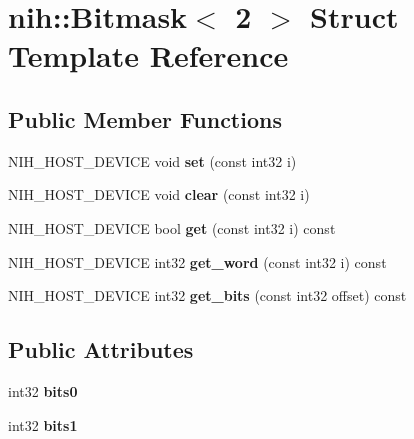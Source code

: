 \hypertarget{structnih_1_1_bitmask_3_012_01_4}{
\section{nih\-:\-:\-Bitmask$<$ 2 $>$ \-Struct \-Template \-Reference}
\label{structnih_1_1_bitmask_3_012_01_4}
}
\subsection*{\-Public \-Member \-Functions}
\begin{DoxyCompactItemize}
\item 
\hypertarget{structnih_1_1_bitmask_3_012_01_4_a5fefd68260586a2c0f29f5239f2c33d7}{
\-N\-I\-H\-\_\-\-H\-O\-S\-T\-\_\-\-D\-E\-V\-I\-C\-E void {\bfseries set} (const int32 i)}
\label{structnih_1_1_bitmask_3_012_01_4_a5fefd68260586a2c0f29f5239f2c33d7}

\item 
\hypertarget{structnih_1_1_bitmask_3_012_01_4_a787f893fbd1e4b4d9101004dc47ac9a6}{
\-N\-I\-H\-\_\-\-H\-O\-S\-T\-\_\-\-D\-E\-V\-I\-C\-E void {\bfseries clear} (const int32 i)}
\label{structnih_1_1_bitmask_3_012_01_4_a787f893fbd1e4b4d9101004dc47ac9a6}

\item 
\hypertarget{structnih_1_1_bitmask_3_012_01_4_ab9309a5f6621a86279218251852193d9}{
\-N\-I\-H\-\_\-\-H\-O\-S\-T\-\_\-\-D\-E\-V\-I\-C\-E bool {\bfseries get} (const int32 i) const }
\label{structnih_1_1_bitmask_3_012_01_4_ab9309a5f6621a86279218251852193d9}

\item 
\hypertarget{structnih_1_1_bitmask_3_012_01_4_a7213ef4fdef8d31fe52423822208b3c4}{
\-N\-I\-H\-\_\-\-H\-O\-S\-T\-\_\-\-D\-E\-V\-I\-C\-E int32 {\bfseries get\-\_\-word} (const int32 i) const }
\label{structnih_1_1_bitmask_3_012_01_4_a7213ef4fdef8d31fe52423822208b3c4}

\item 
\hypertarget{structnih_1_1_bitmask_3_012_01_4_a5216bc0a514d8d098f2e2de38bded7b0}{
\-N\-I\-H\-\_\-\-H\-O\-S\-T\-\_\-\-D\-E\-V\-I\-C\-E int32 {\bfseries get\-\_\-bits} (const int32 offset) const }
\label{structnih_1_1_bitmask_3_012_01_4_a5216bc0a514d8d098f2e2de38bded7b0}

\end{DoxyCompactItemize}
\subsection*{\-Public \-Attributes}
\begin{DoxyCompactItemize}
\item 
\hypertarget{structnih_1_1_bitmask_3_012_01_4_a32013e79ae7f3754c46d42d3a81c94c1}{
int32 {\bfseries bits0}}
\label{structnih_1_1_bitmask_3_012_01_4_a32013e79ae7f3754c46d42d3a81c94c1}

\item 
\hypertarget{structnih_1_1_bitmask_3_012_01_4_a86867ed90dd53c9a51e62b70247855dc}{
int32 {\bfseries bits1}}
\label{structnih_1_1_bitmask_3_012_01_4_a86867ed90dd53c9a51e62b70247855dc}

\end{DoxyCompactItemize}
